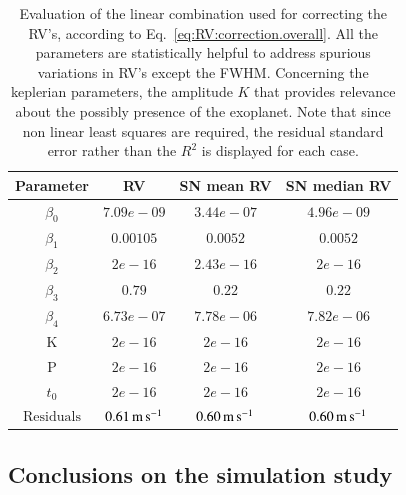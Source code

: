 \documentclass[11pt, oneside]{article}
\def\ms{\hbox{\,m\,s$^{-1}$}}         %
\begin{document}
\begin{table}
\centering
\begin{tabular}{|c|c|c|c|}
\hline
Parameter          & RV         &   SN mean RV &   SN median RV \\
\hline
$\beta_{0}$            &    $7.09e-09$    & $ 3.44e-07$  & $4.96e-09$ \\
\hline
$\beta_{1}$            &    $0.00105$    & $0.0052$  & $0.0052$ \\
\hline
$\beta_{2}$            &     $2e-16$   & $2.43e-16$ & $2e-16$\\
\hline
$\beta_{3}$            &     $0.79$   &  $0.22$  & $0.22$\\
\hline
$\beta_{4}$            &     $6.73e-07$   &  $7.78e-06$ & $7.82e-06$\\
\hline
K            &     $2e-16$   &  $2e-16$   & $ 2e-16 $\\
\hline
P            &     $2e-16$   &  $2e-16$ & $2e-16 $\\
\hline
$t_{0}$            &     $2e-16$   &  $2e-16$ & $2e-16 $\\
\hline
$\text{Residuals}$      &     $0.61 \ms$    &  $ 0.60 \ms$ & $0.60 \ms$  \\
\hline
\end{tabular}
\caption{Evaluation of the linear combination used for correcting the RV's, according to Eq.~\ref{eq:RV:correction.overall}. All the parameters are statistically helpful to address spurious variations in RV's except the FWHM. Concerning the keplerian parameters, the amplitude $K$ that provides relevance about the possibly presence of the exoplanet. Note that since non linear least squares are required, the residual standard error rather than the $R^2$ is displayed for each case.}
\label{table:spotplanet.test}
\end{table}

\subsection{Conclusions on the simulation study} \label{sec:soap.conclusions}
\end{document}
